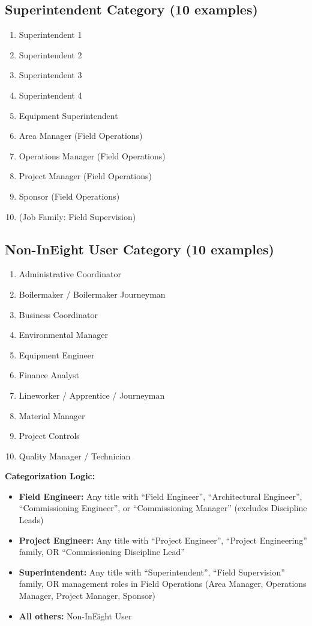 \documentclass[11pt, letterpaper]{article}
\begin{document}
\subsection*{Superintendent Category (10 examples)}
\begin{enumerate}[nosep, leftmargin=2em]
    \item Superintendent 1
    \item Superintendent 2
    \item Superintendent 3
    \item Superintendent 4
    \item Equipment Superintendent
    \item Area Manager (Field Operations)
    \item Operations Manager (Field Operations)
    \item Project Manager (Field Operations)
    \item Sponsor (Field Operations)
    \item (Job Family: Field Supervision)
\end{enumerate}

\subsection*{Non-InEight User Category (10 examples)}
\begin{enumerate}[nosep, leftmargin=2em]
    \item Administrative Coordinator
    \item Boilermaker / Boilermaker Journeyman
    \item Business Coordinator
    \item Environmental Manager
    \item Equipment Engineer
    \item Finance Analyst
    \item Lineworker / Apprentice / Journeyman
    \item Material Manager
    \item Project Controls
    \item Quality Manager / Technician
\end{enumerate}

\vspace{0.5em}
\textbf{Categorization Logic:}
\begin{itemize}[nosep, leftmargin=2em]
    \item \textbf{Field Engineer:} Any title with ``Field Engineer'', ``Architectural Engineer'', ``Commissioning Engineer'', or ``Commissioning Manager'' (excludes Discipline Leads)
    \item \textbf{Project Engineer:} Any title with ``Project Engineer'', ``Project Engineering'' family, OR ``Commissioning Discipline Lead''
    \item \textbf{Superintendent:} Any title with ``Superintendent'', ``Field Supervision'' family, OR management roles in Field Operations (Area Manager, Operations Manager, Project Manager, Sponsor)
    \item \textbf{All others:} Non-InEight User
\end{itemize}
\end{document}
